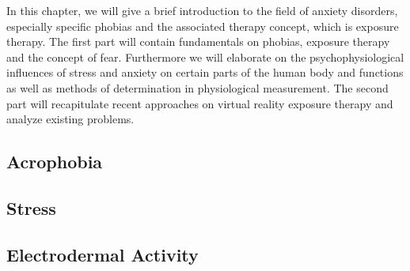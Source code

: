 In this chapter, we will give a brief introduction to the field of anxiety disorders, especially specific phobias and the associated therapy concept, which is exposure therapy. The first part will contain fundamentals on phobias, exposure therapy and the concept of fear. Furthermore we will elaborate on the psychophysiological influences of stress and anxiety on certain parts of the human body and functions as well as methods of determination in physiological measurement. The second part will recapitulate recent approaches on virtual reality exposure therapy and analyze existing problems. 

\subsection{Acrophobia} 

 
\subsection{Stress}

\subsection{Electrodermal Activity}
%

